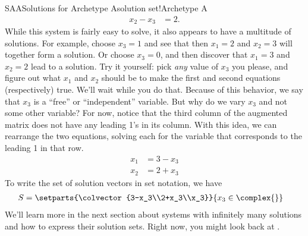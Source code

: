 \begin{example}{SAA}{Solutions for Archetype A}{solution set!Archetype A}
\begin{align*}
x_2-x_3&=2.
\end{align*}
%
While this system is fairly easy to solve, it also appears to have a multitude of solutions.  For example, choose $x_3=1$ and see that then $x_1=2$ and $x_2=3$ will together form a solution.  Or choose $x_3=0$, and then discover that $x_1=3$ and $x_2=2$ lead to a solution.  Try it yourself: pick {\em any} value of $x_3$ you please, and figure out what $x_1$ and $x_2$ should be to make the first and second equations (respectively) true.  We'll wait while you do that.  Because of this behavior, we say that $x_3$ is a ``free'' or ``independent'' variable.  But why do we vary $x_3$ and not some other variable?  For now, notice that the third column of the augmented matrix does not have any leading 1's in its column.  With this idea, we can rearrange the two equations, solving each for the variable that corresponds to the leading 1 in that row.
%
\begin{align*}
x_1&=3-x_3\\
x_2&=2+x_3
\end{align*}
%
To write the set of solution vectors in set notation, we have
\begin{align*}
S&=\setparts{\colvector{3-x_3\\2+x_3\\x_3}}{x_3\in\complex{\null}}
\end{align*}
%
We'll learn more in the next section about systems with infinitely many solutions and how to express their solution sets.  Right now, you might look back at  .
\end{example}
%
